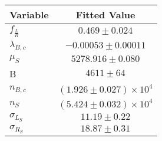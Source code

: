 \begin{tabular}[t]{lc}
\hline
Variable &Fitted Value\\
\hline\hline
$f_{\frac{L}{R}}$&$0.469\pm0.024$\\
\hline
$\lambda_{B,c}$&$-0.00053\pm0.00011$\\
\hline
$\mu_S$&$5278.916\pm0.080$\\
\hline
B&$4611\pm64$\\
\hline
$n_{B,c}$&$(1.926\pm0.027)\times 10^4$\\
\hline
$n_S$&$(5.424\pm0.032)\times 10^4$\\
\hline
$\sigma_{L_S}$&$11.19\pm0.22$\\
\hline
$\sigma_{R_S}$&$18.87\pm0.31$\\
\hline
\end{tabular}